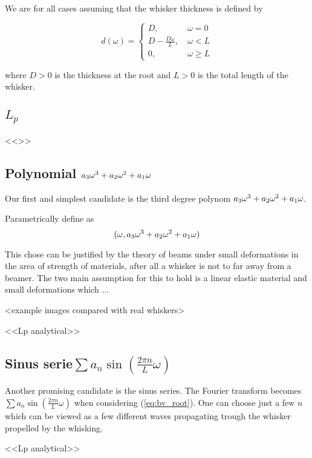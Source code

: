 We are for all cases assuming that the whisker thickness is defined by

\begin{equation}
    d(\omega) = \begin{cases}
        D,~& \omega=0\\
        D-\frac{D\omega}{L},~& \omega<L\\
        0,~& \omega\ge L
    \end{cases}
\end{equation}

where $D>0$ is the thickness at the root and $L>0$ is the total length of the
whisker.


\subsection{$L_p$}
    <<>>

\subsection{Polynomial $a_3\omega^3+a_2\omega^2+a_1\omega$}

    Our first and simplest candidate is the third degree polynom $a_3\omega^3+a_2\omega^2+a_1\omega$.

    Parametrically define as
    \begin{equation}
        (\omega,a_3\omega^3+a_2\omega^2+a_1\omega)
    \end{equation}

    This chose can be justified by the theory of beams under small deformations 
    in the area of strength of materials, after all a whisker is not to far 
    away from a beamer\cite{Hallfasthet}. The two main assumption
    for this to hold is a linear elastic material and small deformations which
    ...

    <example images compared with real whiskers>

    <<Lp analytical>>

\subsection{Sinus serie$\sum{a_n\sin (\frac{2\pi n}{L}\omega)}$}
    Another promising candidate is the sinus series.
    The Fourier transform becomes $\sum{a_n\sin (\frac{2\pi n}{L}\omega)}$ when
    considering (\ref{eq:bv_root}). One can choose just a few $n$ which can be
    viewed as a few different waves propagating trough the whisker propelled by
    the whisking. 

    <<Lp analytical>>


